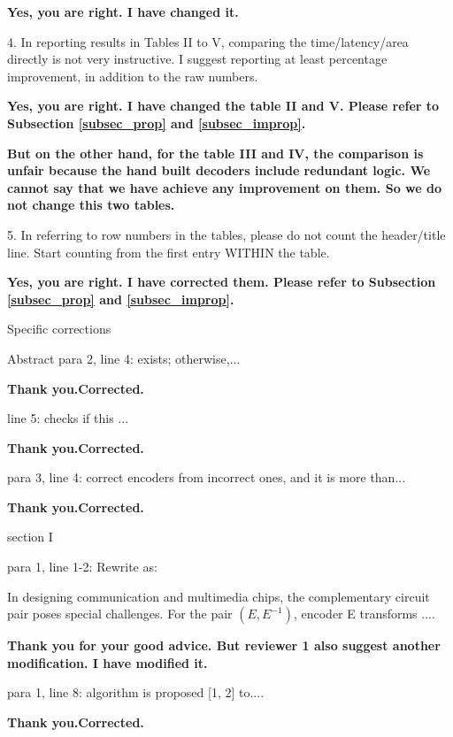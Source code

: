 \documentclass[journal]{IEEEtran}
\begin{document}
{\smallskip
\textbf{Yes,
you are right.
I have changed it.}

\bigskip

4. In reporting results in Tables II to V, comparing the time/latency/area directly is not very instructive. I suggest reporting at least percentage improvement, in addition to the raw numbers.

\smallskip
\textbf{Yes,
you are right.
I have changed the table II and V.
Please refer to Subsection \ref{subsec_prop} and \ref{subsec_improp}.}

\textbf{But on the other hand,
for the table III and IV,
the comparison is unfair because the hand built decoders include redundant logic.
We cannot say that we have achieve any improvement on them.
So we do not change this two tables.}

\bigskip

5. In referring to row numbers in the tables, please do not count the header/title line. Start counting from the first entry WITHIN the table.

\smallskip
\textbf{Yes,
you are right.
I have corrected them.
Please refer to Subsection \ref{subsec_prop} and \ref{subsec_improp}.}

\bigskip

Specific corrections

Abstract para 2, line 4: exists; otherwise,...

\smallskip
\textbf{Thank you.Corrected.}
\smallskip

                               line 5: checks if this ...

\smallskip
\textbf{Thank you.Corrected.}
\smallskip

                 para 3, line 4: correct encoders from incorrect ones, and it is more than...

\smallskip
\textbf{Thank you.Corrected.}
\smallskip

section I

para 1, line 1-2: Rewrite as:

In designing communication and multimedia chips, the complementary circuit pair poses special challenges.  For the pair $(E, E^{-1})$, encoder E transforms ....

\smallskip
\textbf{Thank you for your good advice.
But reviewer 1 also suggest another modification.
I have modified it.}
\smallskip

para 1, line 8: algorithm is proposed [1, 2] to....

\smallskip
\textbf{Thank you.Corrected.}
\smallskip


}
\end{document}
